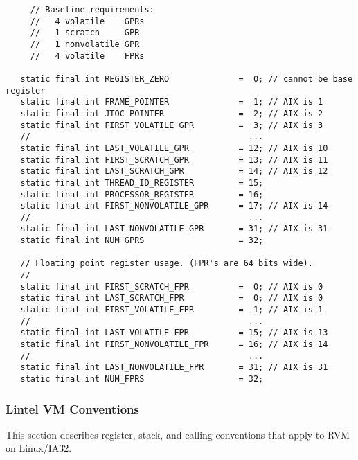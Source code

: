 \begin{verbatim}
     // Baseline requirements:
     //   4 volatile    GPRs
     //   1 scratch     GPR
     //   1 nonvolatile GPR
     //   4 volatile    FPRs

   static final int REGISTER_ZERO              =  0; // cannot be base register
   static final int FRAME_POINTER              =  1; // AIX is 1
   static final int JTOC_POINTER               =  2; // AIX is 2
   static final int FIRST_VOLATILE_GPR         =  3; // AIX is 3
   //                                            ...
   static final int LAST_VOLATILE_GPR          = 12; // AIX is 10
   static final int FIRST_SCRATCH_GPR          = 13; // AIX is 11
   static final int LAST_SCRATCH_GPR           = 14; // AIX is 12
   static final int THREAD_ID_REGISTER         = 15;
   static final int PROCESSOR_REGISTER         = 16;
   static final int FIRST_NONVOLATILE_GPR      = 17; // AIX is 14
   //                                            ...
   static final int LAST_NONVOLATILE_GPR       = 31; // AIX is 31
   static final int NUM_GPRS                   = 32;

   // Floating point register usage. (FPR's are 64 bits wide).
   //
   static final int FIRST_SCRATCH_FPR          =  0; // AIX is 0
   static final int LAST_SCRATCH_FPR           =  0; // AIX is 0
   static final int FIRST_VOLATILE_FPR         =  1; // AIX is 1
   //                                            ...
   static final int LAST_VOLATILE_FPR          = 15; // AIX is 13
   static final int FIRST_NONVOLATILE_FPR      = 16; // AIX is 14
   //                                            ...
   static final int LAST_NONVOLATILE_FPR       = 31; // AIX is 31
   static final int NUM_FPRS                   = 32;
\end{verbatim}



\subsubsection{Lintel VM Conventions} \label{lintel-conventions}

This section describes register, stack, and calling conventions that apply to 
RVM on Linux/IA32.


